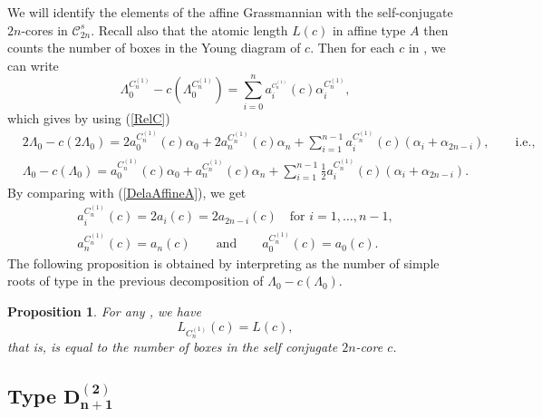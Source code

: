 \documentclass[10pt,a4paper]{amsart}
\newtheorem{Proposition}[Theorem]{Proposition}
 { \theoremstyle{definition}
\newtheorem{Definition}[Theorem]{Definition}
\newtheorem{Note}[Theorem]{Note}
\newtheorem{Example}[Theorem]{Example}
\newtheorem{Remark}[Theorem]{Remark} }
\numberwithin{equation}{section}
\begin{document}
We will identify the elements of the affine Grassmannian 
with the self-conjugate $2n$-cores in $\mathcal{C}%
_{2n}^{s}$. Recall also that the atomic length $L(c)$ in affine type $A$
then counts the number of boxes in the Young diagram of $c$. Then for each $c
$ in , we can write%
\begin{equation*}
\Lambda _{0}^{C_{n}^{(1)}}-c(\Lambda
_{0}^{C_{n}^{(1)}})=\sum_{i=0}^{n}a_{i}^{_{C_{n}^{(1)}}}(c)\alpha
_{i}^{C_{n}^{(1)}},
\end{equation*}%
which gives by using (\ref{RelC})%
\begin{align*}
	&2\Lambda _{0}-c(2\Lambda _{0})=2a_{0}^{C_{n}^{(1)}}(c)\alpha
	_{0}+2a_{n}^{C_{n}^{(1)}}(c)\alpha
	_{n}+\sum_{i=1}^{n-1}a_{i}^{C_{n}^{(1)}}(c)(\alpha _{i}+\alpha _{2n-i}), \qquad\text{i.e.,} \\
	&\Lambda _{0}-c(\Lambda _{0})=a_{0}^{C_{n}^{(1)}}(c)\alpha
	_{0}+a_{n}^{C_{n}^{(1)}}(c)\alpha _{n}+\sum_{i=1}^{n-1}\frac{1}{2}
	a_{i}^{C_{n}^{(1)}}(c)(\alpha _{i}+\alpha _{2n-i}).
\end{align*}
By comparing with (\ref{DelaAffineA}), we get
\begin{gather*}
a_{i}^{C_{n}^{(1)}}(c)=2a_{i}(c)=2a_{2n-i}(c)\quad \text{for }i=1,\dots ,n-1, \\
a_{n}^{C_{n}^{(1)}}(c)=a_{n}(c) \qquad \text{and} \qquad a_{0}^{C_{n}^{(1)}}(c)=a_{0}(c).
\end{gather*}
The following proposition is obtained by interpreting 
as the number of simple roots of type  in the previous
decomposition of $\Lambda _{0}-c(\Lambda _{0})$.

\begin{Proposition}
	\label{Prop_C(n,1)}For any , we have
	\begin{equation*}
	L_{C_{n}^{(1)}}(c)=L(c), %
	\end{equation*}%
	that is,  is equal to the number of boxes in the self
	conjugate $2n$-core $c$.
\end{Proposition}

\subsection[Type D\_\{n+1\}\^{}(2)]{Type $\boldsymbol{D_{n+1}^{(2)}}$}
\end{document}
